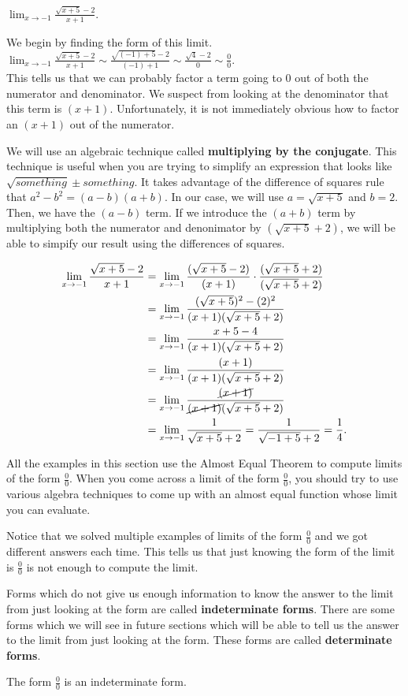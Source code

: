 \documentclass{ximera}
\begin{document}
\begin{example}
$\lim_{x\to-1} \frac{\sqrt{x+5}-2}{x+1}$.

\begin{solution} 
We begin by finding the form of this limit. \\
 $\lim_{x\to-1} \frac{\sqrt{x+5}-2}{x+1} \sim \frac{\sqrt{(-1)+5}-2}{(-1)+1} \sim \frac{\sqrt{4}-2}{0} \sim \frac{0}{0} $. \\
 This tells us that we can probably factor a term going to 0 out of both the numerator and denominator.  We suspect from looking at the denominator that this term is $(x+1)$.  Unfortunately, it is not immediately obvious how to factor an $(x+1)$ out of the numerator.  
 
We will use an algebraic technique called \textbf{multiplying by the conjugate}.  This technique is useful when you are trying to simplify an expression that looks like $\sqrt{something} \pm something$.  It takes advantage of the difference of squares rule that $a^2-b^2=(a-b)(a+b)$.  In our case, we will use $a=\sqrt{x+5}$ and $b=2$.  Then, we have the $(a-b)$ term.  If we introduce the $(a+b)$ term by multiplying both the numerator and denonimator by $(\sqrt{x+5}+2)$, we will be able to simpify our result using the differences of squares.
 
\begin{align*}
\lim_{x\to-1} \frac{\sqrt{x+5}-2}{x+1}&=
\lim_{x\to-1} \frac{(\sqrt{x+5}-2)}{(x+1)} \cdot \frac{(\sqrt{x+5}+2)}{(\sqrt{x+5}+2)} \\
&=\lim_{x\to-1} \frac{(\sqrt{x+5})^2-(2)^2}{(x+1)(\sqrt{x+5}+2)} \\
&=\lim_{x\to-1} {x+5-4\over (x+1)(\sqrt{x+5}+2)} \\
&=\lim_{x\to-1} {(x+1)\over (x+1)(\sqrt{x+5}+2)} \\
&=\lim_{x\to-1} {\cancel{(x+1)}\over \cancel{(x+1)}(\sqrt{x+5}+2)} \\
&=\lim_{x\to-1} {1\over \sqrt{x+5}+2}= \frac{1}{\sqrt{-1+5}+2}={1\over4}.
\end{align*}
\end{solution}
\end{example}

All the examples in this section use the Almost Equal Theorem to compute limits of the form $\frac{0}{0}$.  When you come across a limit of the form $\frac{0}{0}$, you should try to use various algebra techniques to come up with an almost equal function whose limit you can evaluate.

Notice that we solved multiple examples of limits of the form $\frac{0}{0}$ and we got different answers each time.  This tells us that just knowing the form of the limit is $\frac{0}{0}$ is not enough to compute the limit.  

\begin{definition}
Forms which do not give us enough information to know the answer to the limit from just looking at the form are called \textbf{indeterminate forms}.  There are some forms which we will see in future sections which will be able to tell us the answer to the limit from just looking at the form. These forms are called \textbf{determinate forms}.
\end{definition}  

The form $\frac{0}{0}$ is an indeterminate form.
\end{document}
